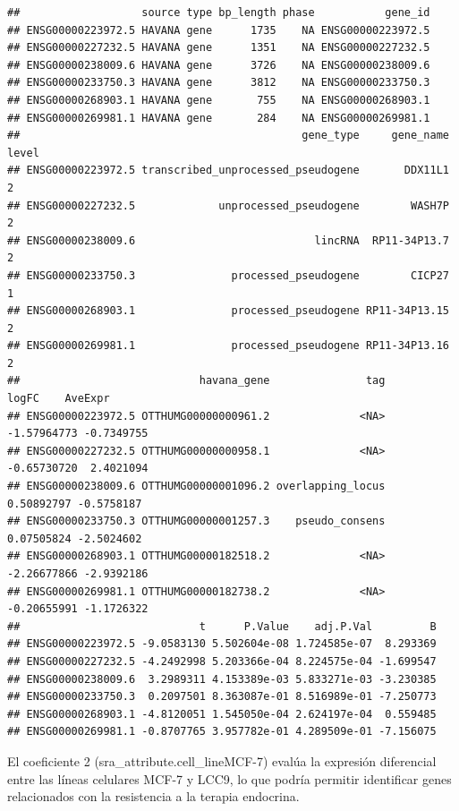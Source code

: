 \documentclass[
]{article}
\newenvironment{Shaded}{\begin{snugshade}}{\end{snugshade}}
\newcommand{\CommentTok}[1]{\textcolor[rgb]{0.56,0.35,0.01}{\textit{#1}}}
\newcommand{\FloatTok}[1]{\textcolor[rgb]{0.00,0.00,0.81}{#1}}
\newcommand{\FunctionTok}[1]{\textcolor[rgb]{0.13,0.29,0.53}{\textbf{#1}}}
\newcommand{\NormalTok}[1]{#1}
\newcommand{\SpecialCharTok}[1]{\textcolor[rgb]{0.81,0.36,0.00}{\textbf{#1}}}
\begin{document}
\begin{verbatim}
##                   source type bp_length phase           gene_id
## ENSG00000223972.5 HAVANA gene      1735    NA ENSG00000223972.5
## ENSG00000227232.5 HAVANA gene      1351    NA ENSG00000227232.5
## ENSG00000238009.6 HAVANA gene      3726    NA ENSG00000238009.6
## ENSG00000233750.3 HAVANA gene      3812    NA ENSG00000233750.3
## ENSG00000268903.1 HAVANA gene       755    NA ENSG00000268903.1
## ENSG00000269981.1 HAVANA gene       284    NA ENSG00000269981.1
##                                            gene_type     gene_name level
## ENSG00000223972.5 transcribed_unprocessed_pseudogene       DDX11L1     2
## ENSG00000227232.5             unprocessed_pseudogene        WASH7P     2
## ENSG00000238009.6                            lincRNA  RP11-34P13.7     2
## ENSG00000233750.3               processed_pseudogene        CICP27     1
## ENSG00000268903.1               processed_pseudogene RP11-34P13.15     2
## ENSG00000269981.1               processed_pseudogene RP11-34P13.16     2
##                            havana_gene               tag       logFC    AveExpr
## ENSG00000223972.5 OTTHUMG00000000961.2              <NA> -1.57964773 -0.7349755
## ENSG00000227232.5 OTTHUMG00000000958.1              <NA> -0.65730720  2.4021094
## ENSG00000238009.6 OTTHUMG00000001096.2 overlapping_locus  0.50892797 -0.5758187
## ENSG00000233750.3 OTTHUMG00000001257.3    pseudo_consens  0.07505824 -2.5024602
## ENSG00000268903.1 OTTHUMG00000182518.2              <NA> -2.26677866 -2.9392186
## ENSG00000269981.1 OTTHUMG00000182738.2              <NA> -0.20655991 -1.1726322
##                            t      P.Value    adj.P.Val         B
## ENSG00000223972.5 -9.0583130 5.502604e-08 1.724585e-07  8.293369
## ENSG00000227232.5 -4.2492998 5.203366e-04 8.224575e-04 -1.699547
## ENSG00000238009.6  3.2989311 4.153389e-03 5.833271e-03 -3.230385
## ENSG00000233750.3  0.2097501 8.363087e-01 8.516989e-01 -7.250773
## ENSG00000268903.1 -4.8120051 1.545050e-04 2.624197e-04  0.559485
## ENSG00000269981.1 -0.8707765 3.957782e-01 4.289509e-01 -7.156075
\end{verbatim}

El coeficiente 2 (sra\_attribute.cell\_lineMCF-7) evalúa la expresión
diferencial entre las líneas celulares MCF-7 y LCC9, lo que podría
permitir identificar genes relacionados con la resistencia a la terapia
endocrina.

\begin{Shaded}
\end{Shaded}
\end{document}
